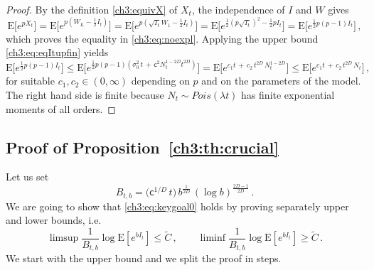 \documentclass[a4paper,reqno,11pt]{amsart}
\numberwithin{equation}{section}
\renewcommand{\tilde}{\widetilde}          %
\newcommand{\PEfont}{\mathrm}
\newcommand{\E}{\ensuremath{\PEfont E}}
\newcommand\sfc{\mathsf{c}}
\begin{document}
\begin{proof}
By the definition \eqref{ch3:equivX} of $X_t$, the independence
of $I$ and $W$ gives
\begin{equation*}
	\E\big[e^{p X_t}\big] = \E\big[e^{p (W_{I_t} - \frac{1}{2}I_t)}\big] 
	= \E\big[e^{p (\sqrt{I_t}W_{1} - \frac{1}{2}I_t)}\big]
	= \E\big[e^{\frac{1}{2} (p \sqrt{I_t})^2 - \frac{1}{2}p I_t}\big]
	= \E\big[ e^{\frac{1}{2}p(p-1)I_t} \big] \,,
\end{equation*}
which proves the equality in \eqref{ch3:eq:noexpl}.
Applying the upper bound \eqref{ch3:eq:eqItupfin} yields
\begin{equation*}
	\E\big[ e^{\frac{1}{2}p(p-1)I_t} \big] \le
	\E\big[ e^{\frac{1}{2}p(p-1)(\sigma_0^2 \, t \,+\, \sfc^2 N_t^{1-2D}t^{2D})} \big]
	= \E\big[ e^{c_1 t \,+\, c_2 \, t^{2D} \, N_t^{1-2D}} \big] 
	\le \E\big[ e^{c_1 t \,+\, c_2 \, t^{2D} \, N_t} \big] \,,
\end{equation*}
for suitable $c_1, c_2 \in (0,\infty)$ depending on $p$ and on the
parameters of the model.
The right hand side is finite because $N_t \sim Pois(\lambda t)$
has finite exponential moments of all orders.
\end{proof}




\subsection{Proof of Proposition~\ref{ch3:th:crucial}}

Let us set
\begin{equation}\label{ch3:eq:Btb}
 B_{t,b}= \big( \sfc^{1/D} \, t \big) \, b^{\frac{1}{2D}} \,
 (\log b)^{\frac{2D-1}{2D}} \,.
\end{equation}
We are going to show that \eqref{ch3:eq:keygoal0} holds by proving
separately upper and lower bounds, i.e.\
\begin{equation}\label{ch3:ubound}
	\limsup \frac{1}{B_{t,b}} 
	\log \E[e^{ b I_t}] \le \tilde C \,, \qquad
	\liminf \frac{1}{B_{t,b}} 
	\log \E[e^{ b I_t}] \ge \tilde C \,.
\end{equation}
We start with the upper bound and we split the proof in steps.
\end{document}
